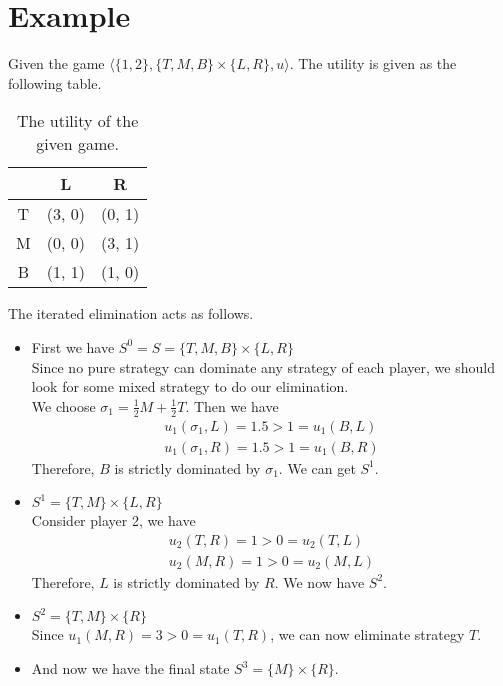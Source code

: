 \documentclass[12pt]{article}
\begin{document}
\section{Example}
Given the game $\langle \{1,2\}, \{T, M, B\} \times \{L, R\}, u\rangle$.
The utility is given as the following table.
\begin{table}[hbtp]
  \centering
  \begin{tabular}{|c|c|c|}
    \hline
         & L     & R \\ \hline
    T    & (3, 0)& (0, 1) \\ \hline
    M    & (0, 0)& (3, 1) \\ \hline  
    B    & (1, 1)& (1, 0) \\ \hline
  \end{tabular}
  \caption{The utility of the given game.}\label{tab:1}
\end{table}
The iterated elimination acts as follows. \\
\begin{itemize}
    \item
    First we have $S^0 = S = \{T, M, B\} \times \{L, R\}$ \\
    Since no pure strategy can dominate any strategy of each player, 
    we should look for some mixed strategy to do our elimination. \\
    We choose $\sigma_1 = \frac{1}{2}M + \frac{1}{2}T$.
    Then we have 
    \begin{align*}
        u_1(\sigma_1, L) = 1.5 > 1 = u_1(B, L) \\
        u_1(\sigma_1, R) = 1.5 > 1 = u_1(B, R)
    \end{align*}
    Therefore, $B$ is strictly dominated by $\sigma_1$.
    We can get $S^1$.
    \item
    $S^1 = \{T, M\} \times \{L, R\}$ \\
    Consider player 2, we have 
    \begin{align*}
        u_2(T, R) = 1 > 0 = u_2(T, L)\\
        u_2(M, R) = 1 > 0 = u_2(M, L)
    \end{align*}
    Therefore, $L$ is strictly dominated by $R$.
    We now have $S^2$.
    \item
    $S^2 = \{T, M\} \times \{R\}$ \\
    Since $u_1(M, R) = 3 > 0 = u_1(T, R)$,
    we can now eliminate strategy $T$.
    \item
    And now we have the final state $S^3 = \{M\} \times \{R\}$.
\end{itemize}
\end{document}
